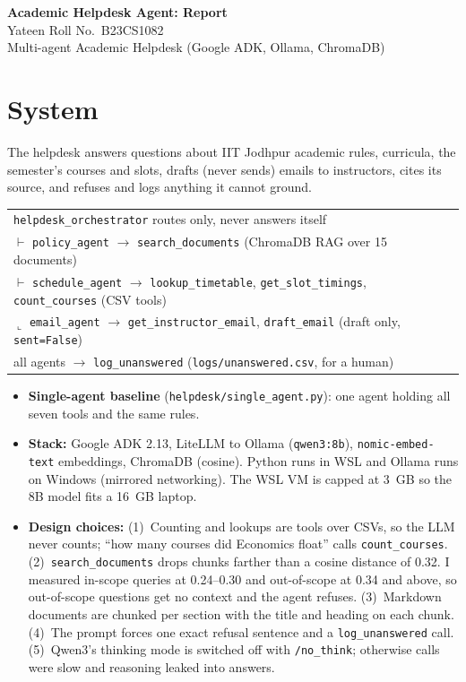 \documentclass[10pt,a4paper]{article}
\newcommand{\code}[1]{\texttt{\small #1}}
\begin{document}
\begin{center}
{\LARGE\bfseries Academic Helpdesk Agent: Report}\\[4pt]
Yateen \quad Roll No.\ B23CS1082\\
Multi-agent Academic Helpdesk (Google ADK, Ollama, ChromaDB)
\end{center}

\section{System}

The helpdesk answers questions about IIT Jodhpur academic rules, curricula, the semester's courses and slots, drafts (never sends) emails to instructors, cites its source, and refuses and logs anything it cannot ground.

\begin{center}\small
\begin{tabular}{@{}l@{}}
\code{helpdesk\_orchestrator} \quad routes only, never answers itself\\
\quad $\vdash$ \code{policy\_agent} $\rightarrow$ \code{search\_documents} (ChromaDB RAG over 15 documents)\\
\quad $\vdash$ \code{schedule\_agent} $\rightarrow$ \code{lookup\_timetable}, \code{get\_slot\_timings}, \code{count\_courses} (CSV tools)\\
\quad $\llcorner$ \code{email\_agent} $\rightarrow$ \code{get\_instructor\_email}, \code{draft\_email} (draft only, \code{sent=False})\\
all agents $\rightarrow$ \code{log\_unanswered} (\code{logs/unanswered.csv}, for a human)
\end{tabular}
\end{center}

\begin{itemize}
\item \textbf{Single-agent baseline} (\code{helpdesk/single\_agent.py}): one agent holding all seven tools and the same rules.
\item \textbf{Stack:} Google ADK 2.13, LiteLLM to Ollama (\code{qwen3:8b}), \code{nomic-embed-text} embeddings, ChromaDB (cosine). Python runs in WSL and Ollama runs on Windows (mirrored networking). The WSL VM is capped at 3~GB so the 8B model fits a 16~GB laptop.
\item \textbf{Design choices:}
  (1)~Counting and lookups are tools over CSVs, so the LLM never counts; ``how many courses did Economics float'' calls \code{count\_courses}.
  (2)~\code{search\_documents} drops chunks farther than a cosine distance of 0.32. I measured in-scope queries at 0.24--0.30 and out-of-scope at 0.34 and above, so out-of-scope questions get no context and the agent refuses.
  (3)~Markdown documents are chunked per section with the title and heading on each chunk.
  (4)~The prompt forces one exact refusal sentence and a \code{log\_unanswered} call.
  (5)~Qwen3's thinking mode is switched off with \code{/no\_think}; otherwise calls were slow and reasoning leaked into answers.
\end{itemize}
\end{document}

